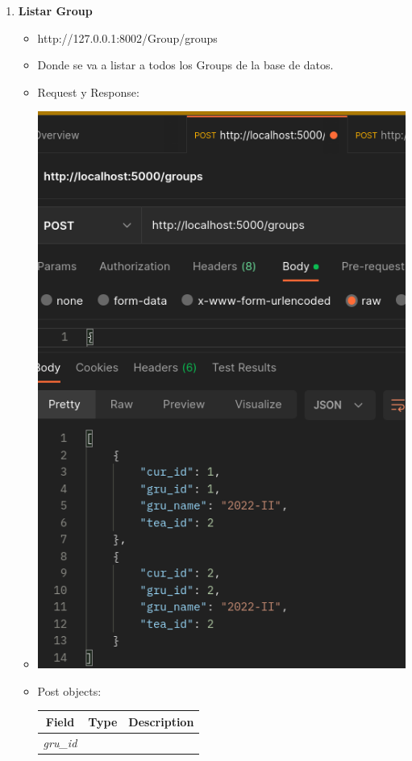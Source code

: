 \documentclass{article}
\begin{document}
\begin{enumerate}
    \item \textbf{Listar Group}
    \begin{itemize}
        \item http://127.0.0.1:8002/Group/groups
        \item Donde se va a listar a todos los Groups de la base de
        datos.
        \item Request y Response:
        \item \includegraphics[scale=.5]{assets/group/groups.png}
        \item Post objects:
        \begin{table}[H] \centering \begin{tabular}{|l|l|l|} \hline
        \multicolumn{1}{|c|}{\textbf{Field}} &
        \multicolumn{1}{c|}{\textbf{Type}} &
        \multicolumn{1}{c|}{\textbf{Description}} \\ \hline \textit{gru\_id} &

\end{tabular}
\end{table}
\end{itemize}
\end{enumerate}
\end{document}

